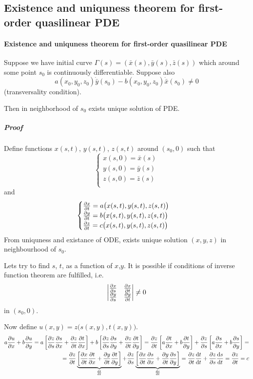 \subsection{Existence and uniquness theorem for first-order quasilinear PDE}
\paragraph{Existence and uniquness theorem for first-order quasilinear PDE}
Suppose we have initial curve $\Gamma(s) = \left(\bar{x}(s), \bar{y}(s), \bar{z}(s) \right)$ which around some point $s_0$ is continuously differentiable. Suppose also
$$a(x_0,y_0,z_0) \dot{\bar{y}}(s_0) - b(x_0,y_0,z_0) \dot{\bar{x}}(s_0) \neq 0$$
(transversality condition). 

Then in neighborhood of $s_0$ exists unique solution of PDE.

\subparagraph{Proof}
Define functions $x(s,t)$, $y(s,t)$, $z(s,t)$ around $(s_0,0)$  such that
$$\begin{cases}
x(s,0) = \bar{x}(s)\\
y(s,0) = \bar{y}(s)\\
z(s,0) = \bar{z}(s)\\
\end{cases}$$
and
$$\begin{cases}
\pdv{x}{t} = a\big(x(s,t), y(s,t), z(s,t)\big)\\
\pdv{y}{t} = b\big(x(s,t), y(s,t), z(s,t)\big)\\
\pdv{z}{t} = c\big(x(s,t), y(s,t), z(s,t)\big)
\end{cases}$$
From uniquness and existance of ODE, exists unique solution $(x,y,z)$ in neighbourhood of $s_0$.

Lets try to find $s$, $t$, as a function of $x$,$y$. It is possible if conditions of inverse function theorem are fulfilled, i.e.\
$$\begin{vmatrix}
\pdv{x}{s}&\pdv{x}{t}\\
\pdv{y}{s}&\pdv{y}{t}\\
\end{vmatrix}\neq 0$$
in $(s_0,0)$.

Now define $u(x,y) = z\big(s(x,y), t(x,y)\big)$.
\begin{align*}
a\pdv{u}{x}+b\pdv{u}{y} = a\left[\pdv{z}{s}\pdv{s}{x}+\pdv{z}{t}\pdv{t}{x}\right]+b\left[\pdv{z}{s}\pdv{s}{y}+\pdv{z}{t}\pdv{t}{y}\right] = \pdv{z}{t} \left[a\pdv{t}{x} + b\pdv{t}{y}\right] + \pdv{z}{s} \left[a\pdv{s}{x} + b\pdv{s}{y}\right] =\\= \pdv{z}{t} \underbrace{\left[\pdv{x}{t}\pdv{t}{x} + \pdv{y}{t}\pdv{t}{y}\right]}_{\dv{t}{t}} + \pdv{z}{s} \underbrace{ \left[\pdv{x}{t}\pdv{s}{x} + \pdv{y}{t}\pdv{s}{y}\right]}_{\dv{s}{t}} = \pdv{z}{t}\dv{t}{t}+\pdv{z}{s}\dv{s}{t} = \pdv{z}{t} = c
\end{align*}
